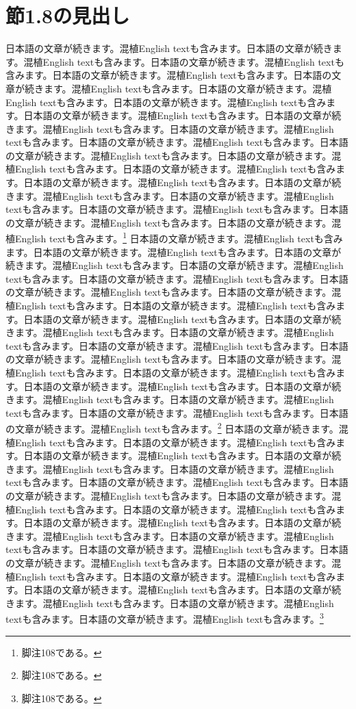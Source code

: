 \documentclass[pdflatex,book]{jlreq}
\begin{document}
\section{節1.8の見出し}
日本語の文章が続きます。混植English textも含みます。日本語の文章が続きます。混植English textも含みます。日本語の文章が続きます。混植English textも含みます。日本語の文章が続きます。混植English textも含みます。日本語の文章が続きます。混植English textも含みます。日本語の文章が続きます。混植English textも含みます。日本語の文章が続きます。混植English textも含みます。日本語の文章が続きます。混植English textも含みます。日本語の文章が続きます。混植English textも含みます。日本語の文章が続きます。混植English textも含みます。日本語の文章が続きます。混植English textも含みます。日本語の文章が続きます。混植English textも含みます。日本語の文章が続きます。混植English textも含みます。日本語の文章が続きます。混植English textも含みます。日本語の文章が続きます。混植English textも含みます。日本語の文章が続きます。混植English textも含みます。日本語の文章が続きます。混植English textも含みます。日本語の文章が続きます。混植English textも含みます。日本語の文章が続きます。混植English textも含みます。日本語の文章が続きます。混植English textも含みます。\footnote{脚注108である。}
日本語の文章が続きます。混植English textも含みます。日本語の文章が続きます。混植English textも含みます。日本語の文章が続きます。混植English textも含みます。日本語の文章が続きます。混植English textも含みます。日本語の文章が続きます。混植English textも含みます。日本語の文章が続きます。混植English textも含みます。日本語の文章が続きます。混植English textも含みます。日本語の文章が続きます。混植English textも含みます。日本語の文章が続きます。混植English textも含みます。日本語の文章が続きます。混植English textも含みます。日本語の文章が続きます。混植English textも含みます。日本語の文章が続きます。混植English textも含みます。日本語の文章が続きます。混植English textも含みます。日本語の文章が続きます。混植English textも含みます。日本語の文章が続きます。混植English textも含みます。日本語の文章が続きます。混植English textも含みます。日本語の文章が続きます。混植English textも含みます。日本語の文章が続きます。混植English textも含みます。日本語の文章が続きます。混植English textも含みます。日本語の文章が続きます。混植English textも含みます。\footnote{脚注108である。}
日本語の文章が続きます。混植English textも含みます。日本語の文章が続きます。混植English textも含みます。日本語の文章が続きます。混植English textも含みます。日本語の文章が続きます。混植English textも含みます。日本語の文章が続きます。混植English textも含みます。日本語の文章が続きます。混植English textも含みます。日本語の文章が続きます。混植English textも含みます。日本語の文章が続きます。混植English textも含みます。日本語の文章が続きます。混植English textも含みます。日本語の文章が続きます。混植English textも含みます。日本語の文章が続きます。混植English textも含みます。日本語の文章が続きます。混植English textも含みます。日本語の文章が続きます。混植English textも含みます。日本語の文章が続きます。混植English textも含みます。日本語の文章が続きます。混植English textも含みます。日本語の文章が続きます。混植English textも含みます。日本語の文章が続きます。混植English textも含みます。日本語の文章が続きます。混植English textも含みます。日本語の文章が続きます。混植English textも含みます。日本語の文章が続きます。混植English textも含みます。\footnote{脚注108である。}
\end{document}
